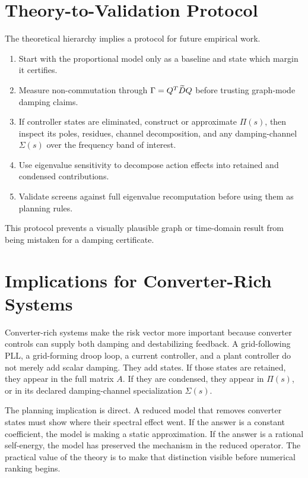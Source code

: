 \section{Theory-to-Validation Protocol}

The theoretical hierarchy implies a protocol for future empirical work.

\begin{enumerate}
\item Start with the proportional model only as a baseline and state which
margin it certifies.
\item Measure non-commutation through \(\Gamma=Q^T\widetilde D Q\) before trusting
graph-mode damping claims.
\item If controller states are eliminated, construct or approximate
\(\Pi(s)\), then inspect its poles, residues, channel decomposition, and any
damping-channel \(\Sigma(s)\) over the frequency band of interest.
\item Use eigenvalue sensitivity to decompose action effects into retained and
condensed contributions.
\item Validate screens against full eigenvalue recomputation before using them
as planning rules.
\end{enumerate}

This protocol prevents a visually plausible graph or time-domain result from
being mistaken for a damping certificate.

\section{Implications for Converter-Rich Systems}

Converter-rich systems make the risk vector more important because converter
controls can supply both damping and destabilizing feedback. A grid-following
PLL, a grid-forming droop loop, a current controller, and a plant controller do
not merely add scalar damping. They add states. If those states are retained,
they appear in the full matrix \(A\). If they are condensed, they appear in
\(\Pi(s)\), or in its declared damping-channel specialization \(\Sigma(s)\).

The planning implication is direct. A reduced model that removes converter
states must show where their spectral effect went. If the answer is a constant
coefficient, the model is making a static approximation. If the answer is a
rational self-energy, the model has preserved the mechanism in the reduced
operator. The practical value of the theory is to make that distinction visible
before numerical ranking begins.
